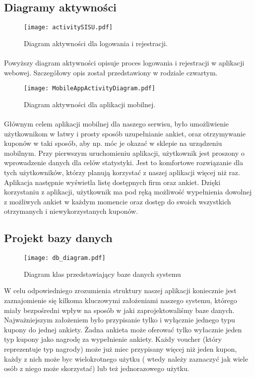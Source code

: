 \subsection{Diagramy aktywności}
\begin{figure}[htbp]
  \centering
  \texttt{[image: activitySISU.pdf]}
  \caption{Diagram aktywności dla logowania i rejestracji.}
\end{figure}

\paragraph{}
Powyższy diagram aktywności opisuje proces logowania i rejestracji w aplikacji webowej. Szczegółowy opis został przedstawiony w rodziale czwartym.

\begin{figure}[htbp]
  \centering
  \texttt{[image: MobileAppActivityDiagram.pdf]}
  \caption{Diagram aktywności dla aplikacji mobilnej.}
\end{figure}

\paragraph{}
Głównym celem aplikacji mobilnej dla naszego serwisu, było umożliwienie użytkownikom w łatwy i prosty sposób uzupełnianie ankiet, oraz otrzymywanie kuponów w taki sposób, aby np. móc je okazać w sklepie na urządzeniu mobilnym. Przy pierwszym uruchomieniu aplikacji, użytkownik jest proszony o wprowadzenie danych dla celów statystyki. Jest to komfortowe rozwiązanie dla tych użytkowników, którzy planują korzystać z naszej aplikacji więcej niż raz. Aplikacja następnie wyświetla listę dostępnych firm oraz ankiet. Dzięki korzystaniu z aplikacji, użytkownik ma pod ręką możliwość wypełnienia dowolnej z możliwych ankiet w każdym momencie oraz dostęp do swoich wszystkich otrzymanych i niewykorzystanych kuponów.

\pagebreak
\subsection{Projekt bazy danych}
\begin{figure}[H]
  \centering
  \texttt{[image: db\_diagram.pdf]}
  \caption{Diagram klas przedstawiający baze danych systemu}
\end{figure}
W celu odpowiedniego zrozumienia struktury naszej aplikacji koniecznie jest zaznajomienie się kilkoma kluczowymi założeniami naszego systemu, którego miały bezpośredni wpływ na sposób w jaki zaprojektowaliśmy baze danych. Najważniejszym założeniem było przypisanie tylko i wyłącznie jednego typu kupony do jednej ankiety. Żadna ankieta może oferować tylko wyłacznie jeden typ kupony jako nagrodę za wypełnienie ankiety. Każdy voucher (który reprezentuje typ nagrody) może już miec przypisany więcej niż jeden kupon, każdy z nich może byc wielokrotnego użytku ( wtedy należy zaznaczyć jak wiele osób z niego może skorzystać) lub też jednorazowego użytku.

